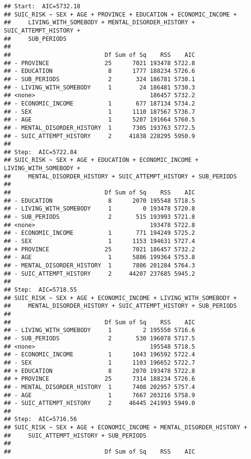 \documentclass[
]{book}
\begin{document}
\begin{verbatim}
## Start:  AIC=5732.18
## SUIC_RISK ~ SEX + AGE + PROVINCE + EDUCATION + ECONOMIC_INCOME + 
##     LIVING_WITH_SOMEBODY + MENTAL_DISORDER_HISTORY + SUIC_ATTEMPT_HISTORY + 
##     SUB_PERIODS
## 
##                           Df Sum of Sq    RSS    AIC
## - PROVINCE                25      7021 193478 5722.8
## - EDUCATION                8      1777 188234 5726.6
## - SUB_PERIODS              2       324 186781 5730.1
## - LIVING_WITH_SOMEBODY     1        24 186481 5730.3
## <none>                                 186457 5732.2
## - ECONOMIC_INCOME          1       677 187134 5734.2
## - SEX                      1      1110 187567 5736.7
## - AGE                      1      5207 191664 5760.5
## - MENTAL_DISORDER_HISTORY  1      7305 193763 5772.5
## - SUIC_ATTEMPT_HISTORY     2     41838 228295 5950.9
## 
## Step:  AIC=5722.84
## SUIC_RISK ~ SEX + AGE + EDUCATION + ECONOMIC_INCOME + LIVING_WITH_SOMEBODY + 
##     MENTAL_DISORDER_HISTORY + SUIC_ATTEMPT_HISTORY + SUB_PERIODS
## 
##                           Df Sum of Sq    RSS    AIC
## - EDUCATION                8      2070 195548 5718.5
## - LIVING_WITH_SOMEBODY     1         0 193478 5720.8
## - SUB_PERIODS              2       515 193993 5721.8
## <none>                                 193478 5722.8
## - ECONOMIC_INCOME          1       771 194249 5725.2
## - SEX                      1      1153 194631 5727.4
## + PROVINCE                25      7021 186457 5732.2
## - AGE                      1      5886 199364 5753.8
## - MENTAL_DISORDER_HISTORY  1      7806 201284 5764.3
## - SUIC_ATTEMPT_HISTORY     2     44207 237685 5945.2
## 
## Step:  AIC=5718.55
## SUIC_RISK ~ SEX + AGE + ECONOMIC_INCOME + LIVING_WITH_SOMEBODY + 
##     MENTAL_DISORDER_HISTORY + SUIC_ATTEMPT_HISTORY + SUB_PERIODS
## 
##                           Df Sum of Sq    RSS    AIC
## - LIVING_WITH_SOMEBODY     1         2 195550 5716.6
## - SUB_PERIODS              2       530 196078 5717.5
## <none>                                 195548 5718.5
## - ECONOMIC_INCOME          1      1043 196592 5722.4
## - SEX                      1      1103 196652 5722.7
## + EDUCATION                8      2070 193478 5722.8
## + PROVINCE                25      7314 188234 5726.6
## - MENTAL_DISORDER_HISTORY  1      7408 202957 5757.4
## - AGE                      1      7667 203216 5758.9
## - SUIC_ATTEMPT_HISTORY     2     46445 241993 5949.0
## 
## Step:  AIC=5716.56
## SUIC_RISK ~ SEX + AGE + ECONOMIC_INCOME + MENTAL_DISORDER_HISTORY + 
##     SUIC_ATTEMPT_HISTORY + SUB_PERIODS
## 
##                           Df Sum of Sq    RSS    AIC

\end{verbatim}
\end{document}
